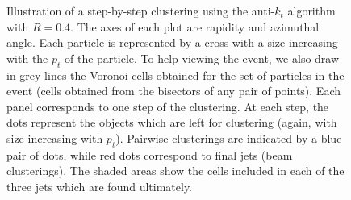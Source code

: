 \begin{figure}
  \caption{
    Illustration of a step-by-step clustering using the anti-$k_t$
    algorithm with $R=0.4$.
    The axes of each plot are rapidity and azimuthal angle. 
    Each particle is represented by a cross with a size increasing
    with the $p_t$ of the particle.
    To help viewing the event, we also draw in grey lines the Voronoi
    cells obtained for the set of particles in the event (\ie cells
    obtained from the bisectors of any pair of points).
    Each panel corresponds to one step of the clustering.
    At each step, the dots represent the objects which are left 
    for clustering (again, with size increasing with $p_t$).
    Pairwise clusterings are indicated by a blue pair of dots, while
    red dots correspond to final jets (\ie beam clusterings).
    The shaded areas show the cells included in each of the three jets
    which are found ultimately. 
  }\label{fig:jet-clustering-steps}
\end{figure}

